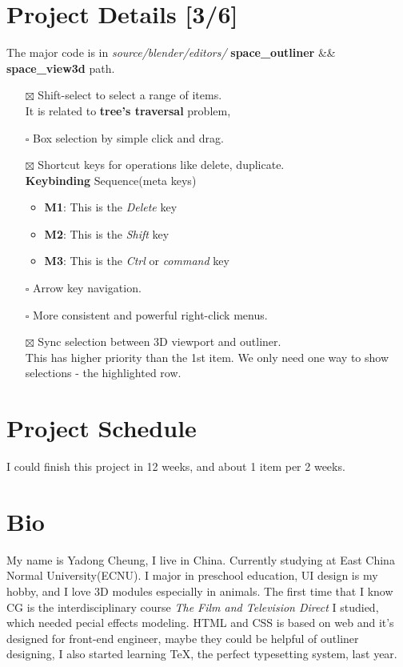 \documentclass[11pt]{article}
\begin{document}
\section*{Project Details [3/6]}
\label{sec:org9a9b4d2}
 The major code is in \emph{source/blender/editors/} \textbf{space\_outliner} \&\& \textbf{space\_view3d}
path.
\begin{itemize}
\item[{$\boxtimes$}] Shift-select to select a range of items.\\
It is related to \textbf{tree's traversal} problem,
\item[{$\square$}] Box selection by simple click and drag.
\item[{$\boxtimes$}] Shortcut keys for operations like delete, duplicate.\\
\textbf{Keybinding} Sequence(meta keys)
\begin{itemize}
\item \textbf{M1}: This is the \emph{Delete} key
\item \textbf{M2}: This is the \emph{Shift} key
\item \textbf{M3}: This is the \emph{Ctrl} or \emph{command} key
\end{itemize}
\item[{$\square$}] Arrow key navigation.
\item[{$\square$}] More consistent and powerful right-click menus.
\item[{$\boxtimes$}] Sync selection between 3D viewport and outliner.\\
This has higher priority than the 1st item. 
We only need one way to show selections - the highlighted row.
\end{itemize}
\section*{Project Schedule}
\label{sec:org0f145fa}
I could finish this project in 12 weeks, and about 1 item per 2 weeks.

\section*{Bio}
\label{sec:org1df334f}
  My name is Yadong Cheung, I live in China.
Currently studying at East China Normal University(ECNU).
I major in preschool education, UI design is my hobby, and I love 3D modules especially in animals.
The first time that I know CG is the interdisciplinary course \emph{The Film and Television Direct} 
I studied, which needed pecial effects modeling. HTML and CSS is based on web and it's designed for
front-end engineer, maybe they could be helpful of outliner designing, I also started learning \TeX, the perfect
typesetting system, last year. 
\end{document}
